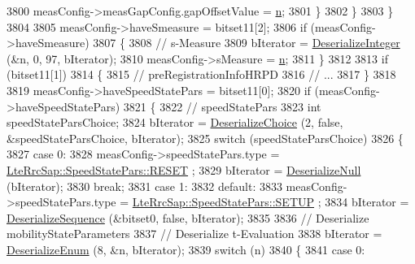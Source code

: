\begin{DoxyCode}
3800               measConfig->measGapConfig.gapOffsetValue = \hyperlink{namespacesample-rng-plot_aeb5ee5c431e338ef39b7ac5431242e1d}{n};
3801             \}
3802         \}
3803     \}
3804 
3805   measConfig->haveSmeasure = bitset11[2];
3806   \textcolor{keywordflow}{if} (measConfig->haveSmeasure)
3807     \{
3808       \textcolor{comment}{// s-Measure}
3809       bIterator = \hyperlink{classns3_1_1Asn1Header_a49802c9af30018b078150e866b6ecae2}{DeserializeInteger} (&n, 0, 97, bIterator);
3810       measConfig->sMeasure = \hyperlink{namespacesample-rng-plot_aeb5ee5c431e338ef39b7ac5431242e1d}{n};
3811     \}
3812 
3813   \textcolor{keywordflow}{if} (bitset11[1])
3814     \{
3815       \textcolor{comment}{// preRegistrationInfoHRPD}
3816       \textcolor{comment}{// ...}
3817     \}
3818 
3819   measConfig->haveSpeedStatePars = bitset11[0];
3820   \textcolor{keywordflow}{if} (measConfig->haveSpeedStatePars)
3821     \{
3822       \textcolor{comment}{// speedStatePars}
3823       \textcolor{keywordtype}{int} speedStateParsChoice;
3824       bIterator = \hyperlink{classns3_1_1Asn1Header_a0af5881f07a0549a8693a1b75c229a90}{DeserializeChoice} (2, \textcolor{keyword}{false}, &speedStateParsChoice, bIterator);
3825       \textcolor{keywordflow}{switch} (speedStateParsChoice)
3826         \{
3827         \textcolor{keywordflow}{case} 0:
3828           measConfig->speedStatePars.type = \hyperlink{structns3_1_1LteRrcSap_1_1SpeedStatePars_a51570eeaecfaab1ca20bdb9df073d0a8aaca7f89f48db7f15fe477338c871fe3c}{LteRrcSap::SpeedStatePars::RESET}
      ;
3829           bIterator = \hyperlink{classns3_1_1Asn1Header_a29bd4508f3f1ef636b3480f524fac0ce}{DeserializeNull} (bIterator);
3830           \textcolor{keywordflow}{break};
3831         \textcolor{keywordflow}{case} 1:
3832         \textcolor{keywordflow}{default}:
3833           measConfig->speedStatePars.type = \hyperlink{structns3_1_1LteRrcSap_1_1SpeedStatePars_a51570eeaecfaab1ca20bdb9df073d0a8a61ba32996ba78b9f21c25297709b8313}{LteRrcSap::SpeedStatePars::SETUP}
      ;
3834           bIterator = \hyperlink{classns3_1_1Asn1Header_a58c68bb97ba3fe2e8fcdd7c208d672b2}{DeserializeSequence} (&bitset0, \textcolor{keyword}{false}, bIterator);
3835 
3836           \textcolor{comment}{// Deserialize mobilityStateParameters}
3837           \textcolor{comment}{// Deserialize t-Evaluation}
3838           bIterator = \hyperlink{classns3_1_1Asn1Header_a4fcc253e0eec3483c775b005c1875f2d}{DeserializeEnum} (8, &n, bIterator);
3839           \textcolor{keywordflow}{switch} (n)
3840             \{
3841             \textcolor{keywordflow}{case} 0:

\end{DoxyCode}
